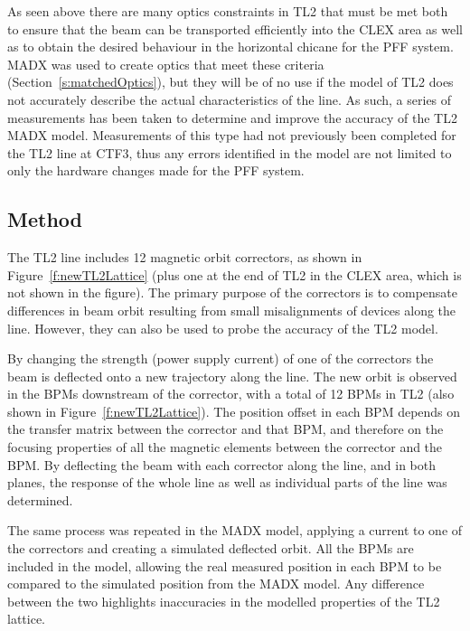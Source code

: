 
As seen above there are many optics constraints in TL2 that must be met both to ensure that the beam can be transported efficiently into the CLEX area as well as to obtain the desired behaviour in the horizontal chicane for the PFF system. MADX was used to create optics that meet these criteria (Section~\ref{s:matchedOptics}), but they will be of no use if the model of TL2 does not accurately describe the actual characteristics of the line. As such, a series of measurements has been taken to determine and improve the accuracy of the TL2 MADX model. Measurements of this type had not previously been completed for the TL2 line at CTF3, thus any errors identified in the model are not limited to only the hardware changes made for the PFF system.

\subsection{Method}
\label{ss:opticsMethod}

The TL2 line includes 12 magnetic orbit correctors, as shown in Figure~\ref{f:newTL2Lattice} (plus one at the end of TL2 in the CLEX area, which is not shown in the figure). 
The primary purpose of the correctors is to compensate differences in beam orbit resulting from small misalignments of devices along the line. However, they can also be used to probe the accuracy of the TL2 model.

By changing the strength (power supply current) of one of the correctors the beam is deflected onto a new trajectory along the line. The new orbit is observed in the BPMs downstream of the corrector, with a total of 12 BPMs in TL2 (also shown in Figure~\ref{f:newTL2Lattice}). The position offset in each BPM depends on the transfer matrix between the corrector and that BPM, and therefore on the focusing properties of all the magnetic elements between the corrector and the BPM. By deflecting the beam with each corrector along the line, and in both planes, the response of the whole line as well as individual parts of the line was determined.

The same process was repeated in the MADX model, applying a current to one of the correctors and creating a simulated deflected orbit. All the BPMs are included in the model, allowing the real measured position in each BPM to be compared to the simulated position from the MADX model. Any difference between the two highlights inaccuracies in the modelled properties of the TL2 lattice.

